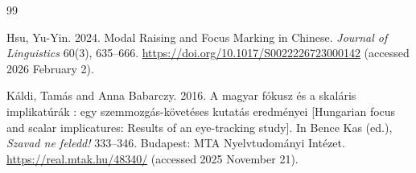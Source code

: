 \documentclass[ruler]{CUP-JNL-LIN}%
\begin{document}
\begin{Backmatter}
\begin{thebibliography}{99}

{Hsu, Yu-Yin}. 2024. Modal Raising and Focus Marking in Chinese. \textit{Journal of Linguistics} 60(3), 635--666. \url{https://doi.org/10.1017/S0022226723000142}  (accessed 2026 February 2).




{Káldi, Tamás and Anna Babarczy}. 2016. A magyar fókusz és a skaláris implikatúrák : egy szemmozgás-követéses kutatás eredményei [Hungarian focus and scalar implicatures: Results of an eye-tracking study]. In Bence Kas (ed.), \textit{Szavad ne feledd!} 333--346. Budapest: MTA Nyelvtudományi Intézet. \url{https://real.mtak.hu/48340/} (accessed 2025 November 21).




\end{thebibliography}
\end{Backmatter}
\end{document}
